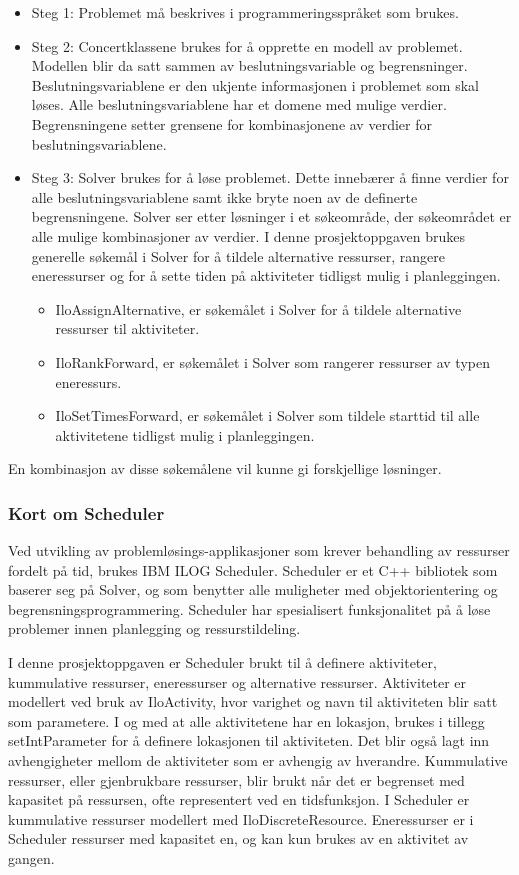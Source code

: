 \begin{itemize}
\item Steg 1:
Problemet må beskrives i programmeringsspråket som brukes.
\item Steg 2:
Concertklassene brukes for å opprette en modell av problemet. Modellen blir da satt sammen av beslutningsvariable og begrensninger. Beslutningsvariablene er den ukjente informasjonen i problemet som skal løses. Alle beslutningsvariablene har et domene med mulige verdier. Begrensningene setter grensene for kombinasjonene av verdier for beslutningsvariablene.
\item Steg 3:
Solver brukes for å løse problemet. Dette innebærer å finne verdier for alle beslutningsvariablene samt ikke bryte noen av de definerte begrensningene. Solver ser etter løsninger i et søkeområde, der søkeområdet er alle mulige kombinasjoner av verdier. I denne prosjektoppgaven brukes generelle søkemål i Solver for å tildele alternative ressurser, rangere eneressurser og for å sette tiden på aktiviteter tidligst mulig i planleggingen.
\begin{itemize}
\item IloAssignAlternative, er søkemålet i Solver for å tildele alternative ressurser til aktiviteter.
\item IloRankForward, er søkemålet i Solver som rangerer ressurser av typen eneressurs.
\item IloSetTimesForward, er søkemålet i Solver som tildele starttid til alle aktivitetene tidligst mulig i planleggingen.
\end{itemize}
\end{itemize}
En kombinasjon av disse søkemålene vil kunne gi forskjellige løsninger.
\cite{cpsolverilog}

\subsubsection{Kort om Scheduler}
Ved utvikling av problemløsings-applikasjoner som krever behandling av ressurser fordelt på tid, brukes IBM ILOG Scheduler. Scheduler er et C++ bibliotek som baserer seg på Solver, og som benytter alle muligheter med objektorientering og begrensningsprogrammering. Scheduler har spesialisert funksjonalitet på å løse problemer innen planlegging og ressurstildeling.

I denne prosjektoppgaven er Scheduler brukt til å definere aktiviteter, kummulative ressurser, eneressurser og alternative ressurser. Aktiviteter er modellert ved bruk av IloActivity, hvor varighet og navn til aktiviteten blir satt som parametere. I og med at alle aktivitetene har en lokasjon, brukes i tillegg setIntParameter for å definere lokasjonen til aktiviteten. Det blir også lagt inn avhengigheter mellom de aktiviteter som er avhengig av hverandre. Kummulative ressurser, eller gjenbrukbare ressurser, blir brukt når det er begrenset med kapasitet på ressursen, ofte representert ved en tidsfunksjon. I Scheduler er kummulative ressurser modellert med IloDiscreteResource. Eneressurser er i Scheduler ressurser med kapasitet en, og kan kun brukes av en aktivitet av gangen.
\cite{cpschedulerilog}